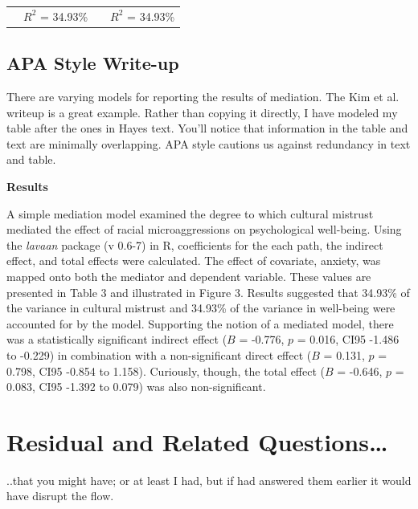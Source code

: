 \documentclass[
  english,
]{book}
\begin{document}
\begin{longtable}[]{@{}lccc@{}}
\toprule
& & & \\
\midrule
\endhead
& \(R^2\) = 34.93\% & & \(R^2\) = 34.93\% \\
\bottomrule
\end{longtable}

\hypertarget{apa-style-write-up}{%
\subsection{APA Style Write-up}\label{apa-style-write-up}}

There are varying models for reporting the results of mediation. The Kim et al. \citep{kim_racial_2017} writeup is a great example. Rather than copying it directly, I have modeled my table after the ones in Hayes \citeyearpar{hayes_introduction_2018} text. You'll notice that information in the table and text are minimally overlapping. APA style cautions us against redundancy in text and table.

\textbf{Results}

A simple mediation model examined the degree to which cultural mistrust mediated the effect of racial microaggressions on psychological well-being. Using the \emph{lavaan} package (v 0.6-7) in R, coefficients for the each path, the indirect effect, and total effects were calculated. The effect of covariate, anxiety, was mapped onto both the mediator and dependent variable. These values are presented in Table 3 and illustrated in Figure 3. Results suggested that 34.93\% of the variance in cultural mistrust and 34.93\% of the variance in well-being were accounted for by the model. Supporting the notion of a mediated model, there was a statistically significant indirect effect (\(B\) = -0.776, \(p\) = 0.016, CI95 -1.486 to -0.229) in combination with a non-significant direct effect (\(B\) = 0.131, \(p\) = 0.798, CI95 -0.854 to 1.158). Curiously, though, the total effect (\(B\) = -0.646, \(p\) = 0.083, CI95 -1.392 to 0.079) was also non-significant.

\hypertarget{residual-and-related-questions}{%
\section{Residual and Related Questions\ldots{}}\label{residual-and-related-questions}}

..that you might have; or at least I had, but if had answered them earlier it would have disrupt the flow.
\end{document}
